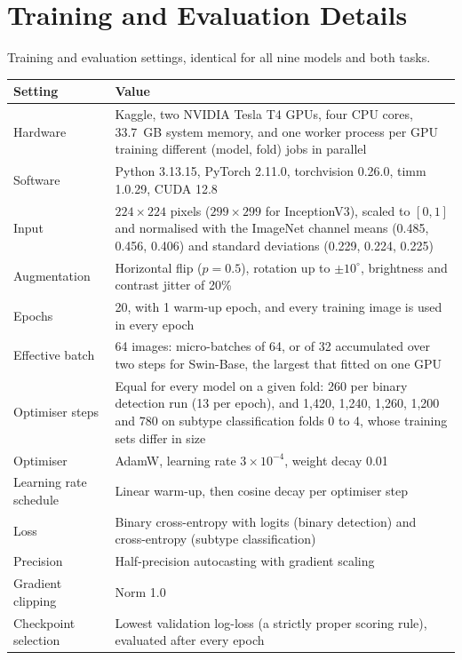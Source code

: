\documentclass[a4paper,fleqn]{cas-sc}
\begin{document}
\section{Training and Evaluation Details}
\label{sec:supp-training}

\begin{heretable}
\centering
\caption{Training and evaluation settings, identical for all nine models and both tasks.}
\label{tab:hyperparams}
\small
\begin{tabularx}{\textwidth}{@{}lY@{}}
\toprule
Setting & Value \\
\midrule
Hardware & Kaggle, two NVIDIA Tesla T4 GPUs, four CPU cores, 33.7~GB system memory, and one worker process per GPU training different (model, fold) jobs in parallel \\
Software & Python 3.13.15, PyTorch 2.11.0, torchvision 0.26.0, timm 1.0.29, CUDA 12.8 \\
Input & $224\times 224$ pixels ($299\times 299$ for InceptionV3), scaled to $[0,1]$ and normalised with the ImageNet channel means (0.485, 0.456, 0.406) and standard deviations (0.229, 0.224, 0.225) \\
Augmentation & Horizontal flip ($p=0.5$), rotation up to $\pm 10^{\circ}$, brightness and contrast jitter of 20\% \\
Epochs & 20, with 1 warm-up epoch, and every training image is used in every epoch \\
Effective batch & 64 images: micro-batches of 64, or of 32 accumulated over two steps for Swin-Base, the largest that fitted on one GPU \\
Optimiser steps & Equal for every model on a given fold: 260 per binary detection run (13 per epoch), and 1,420, 1,240, 1,260, 1,200 and 780 on subtype classification folds 0 to 4, whose training sets differ in size \\
Optimiser & AdamW, learning rate $3\times 10^{-4}$, weight decay 0.01 \\
Learning rate schedule & Linear warm-up, then cosine decay per optimiser step \\
Loss & Binary cross-entropy with logits (binary detection) and cross-entropy (subtype classification) \\
Precision & Half-precision autocasting with gradient scaling \\
Gradient clipping & Norm 1.0 \\
Checkpoint selection & Lowest validation log-loss (a strictly proper scoring rule), evaluated after every epoch \\

\end{tabularx}
\end{heretable}
\end{document}
